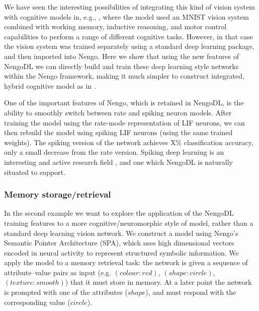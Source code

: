 \documentclass{article}
\begin{document}
We have seen the interesting possibilities of integrating this kind of vision system with cognitive models in, e.g., \citet{Eliasmith2012a}, where the model used an MNIST vision system combined with working memory, inductive reasoning, and motor control capabilities to perform a range of different cognitive tasks.  However, in that case the vision system was trained separately using a standard deep learning package, and then imported into Nengo.  Here we show that using the new features of NengoDL we can directly build and train these deep learning style networks within the Nengo framework, making it much simpler to construct integrated, hybrid cognitive model as in \citet{Eliasmith2012a}.

One of the important features of Nengo, which is retained in NengoDL, is the ability to smoothly switch between rate and spiking neuron models.  After training the model using the rate-mode representation of LIF neurons, we can then rebuild the model using spiking LIF neurons (using the same trained weights).  The spiking version of the network achieves X\% classification accuracy, only a small decrease from the rate version.  Spiking deep learning is an interesting and active research field \citep{Hunsberger2015,Lee2016}, and one which NengoDL is naturally situated to support.

\subsubsection{Memory storage/retrieval}

In the second example we want to explore the application of the NengoDL training features to a more cognitive/neuromorphic style of model, rather than a standard deep learning vision network.  We construct a model using Nengo's Semantic Pointer Architecture (SPA), which uses high dimensional vectors encoded in neural activity to represent structured symbolic information.  We apply the model to a memory retrieval task: the network is given a sequence of attribute--value pairs as input (e.g. $(colour: red)$, $(shape: circle)$, $(texture: smooth)$) that it must store in memory.  At a later point the network is prompted with one of the attributes ($shape$), and must respond with the corresponding value ($circle$).  
\end{document}
